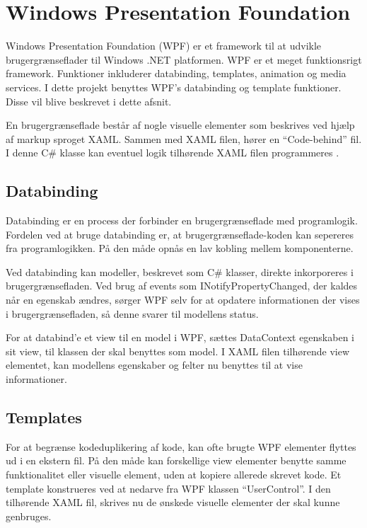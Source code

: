 \section{Windows Presentation Foundation}

Windows Presentation Foundation (WPF) er et framework til at udvikle brugergrænseflader til Windows .NET platformen. WPF er et meget funktionsrigt framework. Funktioner inkluderer databinding, templates, animation og media services. I dette projekt benyttes WPF's databinding og template funktioner. Disse vil blive beskrevet i dette afsnit.

En brugergrænseflade består af nogle visuelle elementer som beskrives ved hjælp af markup sproget XAML. Sammen med XAML filen, hører en \enquote{Code-behind} fil. I denne C\# klasse kan eventuel logik tilhørende XAML filen programmeres \cite{microsoft_wpf}.

\subsection{Databinding}

Databinding er en process der forbinder en brugergrænseflade med programlogik. Fordelen ved at bruge databinding er, at brugergrænseflade-koden kan sepereres fra programlogikken. På den måde opnås en lav kobling mellem komponenterne. 

Ved databinding kan modeller, beskrevet som C\# klasser, direkte inkorporeres i brugergrænsefladen. Ved brug af events som INotifyPropertyChanged, der kaldes når en egenskab ændres, sørger WPF selv for at opdatere informationen der vises i brugergrænsefladen, så denne svarer til modellens status.

For at databind'e et view til en model i WPF, sættes DataContext egenskaben i sit view, til klassen der skal benyttes som model. I XAML filen tilhørende view elementet, kan modellens egenskaber og felter nu benyttes til at vise informationer.

\subsection{Templates}

For at begrænse kodeduplikering af kode, kan ofte brugte WPF elementer flyttes ud i en ekstern fil. På den måde kan forskellige view elementer benytte samme funktionalitet eller visuelle element, uden at kopiere allerede skrevet kode. Et template konstrueres ved at nedarve fra WPF klassen \enquote{UserControl}. I den tilhørende XAML fil, skrives nu de ønskede visuelle elementer der skal kunne genbruges.

